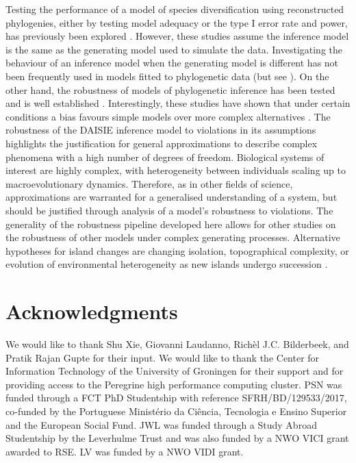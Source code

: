 \documentclass{article}
\begin{document}
Testing the performance of a model of species diversification using reconstructed phylogenies, either by testing model adequacy or the type I error rate and power, has previously been explored \citep{davis_exploring_2013, pennell_model_2015, rabosky_model_2015, etienne_how_2016}. However, these studies assume the inference model is the same as the generating model used to simulate the data. Investigating the behaviour of an inference model when the generating model is different has not been frequently used in models fitted to phylogenetic data (but see \cite{simonet_robustness_2018}). On the other hand, the robustness of models of phylogenetic inference has been tested and is well established \citep{huelsenbeck_performance_1995, bilderbeek_quantifying_2021}. Interestingly, these studies have shown that under certain conditions a bias favours simple models over more complex alternatives \citep{yang_how_1997, bruno_topological_1999}. The robustness of the DAISIE inference model to violations in its assumptions highlights the justification for general approximations to describe complex phenomena with a high number of degrees of freedom. Biological systems of interest are highly complex, with heterogeneity between individuals scaling up to macroevolutionary dynamics. Therefore, as in other fields of science, approximations are warranted for a generalised understanding of a system, but should be justified through analysis of a model’s robustness to violations. The generality of the robustness pipeline developed here allows for other studies on the robustness of other models under complex generating processes. Alternative hypotheses for island changes are changing isolation, topographical complexity, or evolution of environmental heterogeneity as new islands undergo succession \citep{massol_island_2017, barajasbarbosa_environmental_2020}.

\section*{Acknowledgments}

We would like to thank Shu Xie, Giovanni Laudanno, Richèl J.C. Bilderbeek, and Pratik Rajan Gupte for their input. We would like to thank the Center for Information Technology of the University of Groningen for their support and for providing access to the Peregrine high performance computing cluster. PSN was funded through a FCT PhD Studentship with reference SFRH/BD/129533/2017, co-funded by the Portuguese Ministério da Ciência, Tecnologia e Ensino Superior and the European Social Fund. JWL was funded through a Study Abroad Studentship by the Leverhulme Trust and was also funded by a NWO VICI grant awarded to RSE. LV was funded by a NWO VIDI grant.
\end{document}
